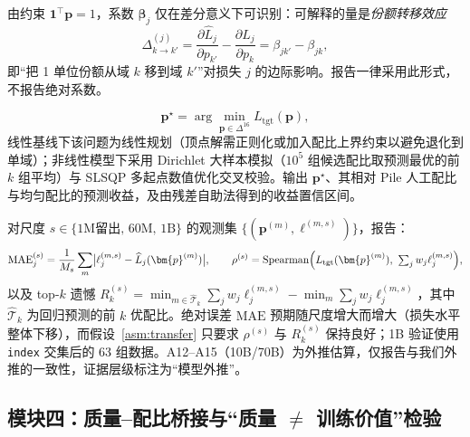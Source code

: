 \begin{remark}[可识别性]\label{rem:identify}
由约束 $\bm{1}^\top\bm{p}=1$，系数 $\bm{\beta}_j$ 仅在差分意义下可识别：可解释的量是\emph{份额转移效应}
\begin{equation}
  \Delta_{k\to k'}^{(j)}
  =\frac{\partial \widehat L_j}{\partial p_{k'}}-\frac{\partial \widehat L_j}{\partial p_{k}}
  =\beta_{jk'}-\beta_{jk},
  \label{eq:transfer-effect}
\end{equation}
即“把 1 单位份额从域 $k$ 移到域 $k'$”对损失 $j$ 的边际影响。报告一律采用此形式，不报告绝对系数。
\end{remark}

\begin{definition}[最优配比问题]\label{def:opt-mix}
\begin{equation}
  \bm{p}^{\star}=\arg\min_{\bm{p}\in\Delta^{16}} L_{\mathrm{tgt}}(\bm{p}),
  \label{eq:opt-mix}
\end{equation}
线性基线下该问题为线性规划（顶点解需正则化或加入配比上界约束以避免退化到单域）；非线性模型下采用 Dirichlet 大样本模拟（$10^5$ 组候选配比取预测最优的前 $k$ 组平均）与 SLSQP 多起点数值优化交叉校验。输出 $\bm{p}^\star$、其相对 Pile 人工配比与均匀配比的预测收益，及由残差自助法得到的收益置信区间。
\end{definition}

\begin{definition}[跨尺度验证指标]\label{def:cross-scale}
对尺度 $s\in\{\text{1M留出},\,\text{60M},\,\text{1B}\}$ 的观测集 $\{(\bm{p}^{(m)},\bm{\ell}^{(m,s)})\}$，报告：
\begin{equation}
  \mathrm{MAE}_j^{(s)}=\frac{1}{M_s}\sum_m\bigl|\ell_j^{(m,s)}-\widehat L_j(\bm{p}^{(m)})\bigr|,
  \qquad
  \rho^{(s)}=\operatorname{Spearman}\Bigl(L_{\mathrm{tgt}}(\bm{p}^{(m)}),\ \textstyle\sum_j w_j\ell_j^{(m,s)}\Bigr),
  \label{eq:rank-transfer}
\end{equation}
以及 top-$k$ 遗憾 $R_k^{(s)}=\min_{m\in\widehat{\mathcal{T}}_k}\sum_j w_j\ell_j^{(m,s)}-\min_{m}\sum_j w_j\ell_j^{(m,s)}$，其中 $\widehat{\mathcal{T}}_k$ 为回归预测的前 $k$ 优配比。绝对误差 $\mathrm{MAE}$ 预期随尺度增大而增大（损失水平整体下移），而假设~\ref{asm:transfer} 只要求 $\rho^{(s)}$ 与 $R_k^{(s)}$ 保持良好；1B 验证使用 \texttt{index} 交集后的 63 组数据。A12--A15（10B/70B）为外推估算，仅报告与我们外推的一致性，证据层级标注为“模型外推”。
\end{definition}

\subsection{模块四：质量--配比桥接与“质量 $\ne$ 训练价值”检验}\label{sec:p1-bridge}


